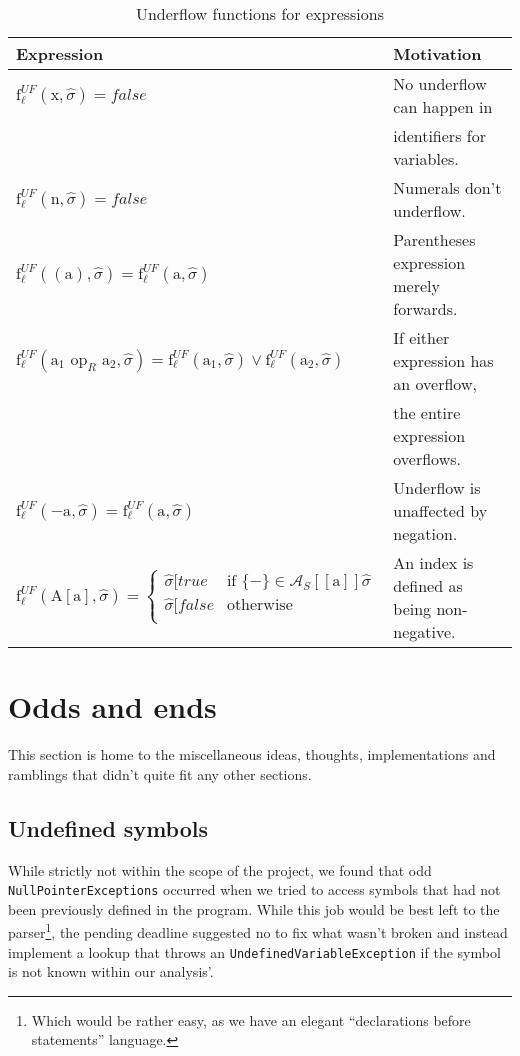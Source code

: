 \begin{table}[h]
\begin{tabular}{| l | l |}
  \hline
  Expression & Motivation\\
  \hline
  \hline
  $\text{f}_\ell^{UF} (\text{x},\widehat{\sigma}) = false $ & No underflow can happen in \\ 
                                                            & identifiers for variables.\\
  \hline
  $\text{f}_\ell^{UF} (\text{n},\widehat{\sigma}) = false $ & Numerals don't underflow.\\
  \hline
  $\text{f}_\ell^{UF} ((\text{a}),\widehat{\sigma}) = \text{f}_\ell^{UF} (\text{a},\widehat{\sigma}) $ & Parentheses expression merely forwards.\\
  \hline
  $\text{f}_\ell^{UF} (\text{a}_1 \text{ op}_R \text{ a}_2,\widehat{\sigma}) = \text{f}_\ell^{UF} (\text{a}_1,\widehat{\sigma}) \vee \text{f}_\ell^{UF} (\text{a}_2,\widehat{\sigma}) $ & If either expression has an overflow,\\
                                & the entire expression overflows.\\
  \hline
  $\text{f}_\ell^{UF} (-\text{a},\widehat{\sigma}) = \text{f}_\ell^{UF} (\text{a},\widehat{\sigma}) $ & Underflow is unaffected by negation.\\
  \hline
  $\text{f}_\ell^{UF} (\text{A}[\text{a}],\widehat{\sigma}) = 
     \begin{cases} 
        \widehat{\sigma}[true   & \text{if } \{-\} \in \mathcal{A}_S [\![\text{a}]\!]\widehat{\sigma}\\
        \widehat{\sigma}[false  & \text{otherwise} \\
     \end{cases}
   $ & An index is defined as being non-negative.\\
  \hline
\end{tabular}
\centering
\caption{Underflow functions for expressions}
\label{table:underflow_functions_expressions}
\end{table}


\section{Odds and ends}
This section is home to the miscellaneous ideas, thoughts, implementations and ramblings that didn't quite fit any other sections.

\subsection{Undefined symbols}
While strictly not within the scope of the project, we found that odd \texttt{NullPointerExceptions} occurred when we tried to access symbols that had not been previously defined in the program. While this job would be best left to the parser\footnote{Which would be rather easy, as we have an elegant ``declarations before statements'' language.}, the pending deadline suggested no to fix what wasn't broken and instead implement a lookup that throws an \texttt{UndefinedVariableException} if the symbol is not known within our analysis'.

